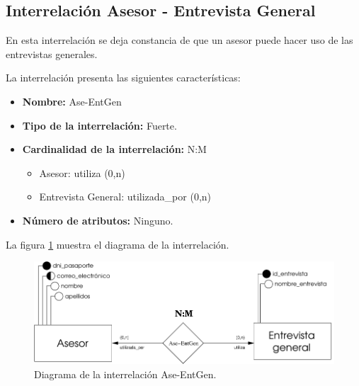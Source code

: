 \subsection{Interrelación Asesor - Entrevista General}

   \begin{description}
      \item[Definición] En esta interrelación se deja constancia de que un
      asesor puede hacer uso de las entrevistas generales.

      \item[Características] La interrelación presenta las siguientes
                             características:

         \begin{itemize}
            \item \textbf{Nombre:} Ase-EntGen
            \item \textbf{Tipo de la interrelación:} Fuerte.
            \item \textbf{Cardinalidad de la interrelación:} N:M
                  \begin{itemize}
                     \item Asesor: utiliza (0,n)
                     \item Entrevista General: utilizada\_por (0,n)
                  \end{itemize}
            \item \textbf{Número de atributos:} Ninguno.
         \end{itemize}

      \item[Diagrama] La figura \ref{diagramaAse-EntGen} muestra el diagrama de la
                      interrelación.

      \item \begin{figure}[!ht]
            \begin{center}
            \includegraphics[]{07.Modelo_Entidad-Interrelacion/7.3.Analisis_Interrelaciones/diagramas/Ase-EntGen.pdf}
            \caption{Diagrama de la interrelación Ase-EntGen.}
            \label{diagramaAse-EntGen}
            \end{center}
         \end{figure}


\end{description}
